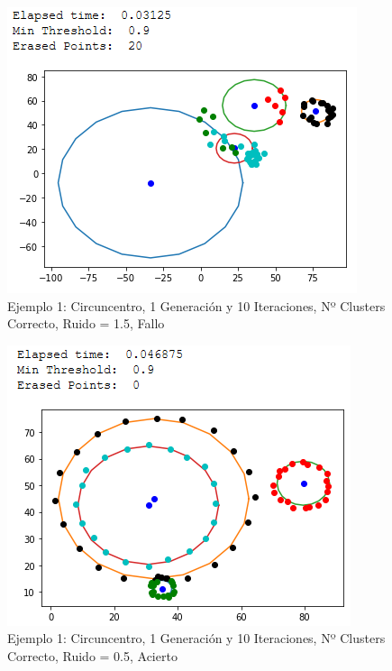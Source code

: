 \documentclass[conference,a4paper]{IEEEtran}
\begin{document}
\begin{figure}[H]
\centering
\includegraphics[scale=0.65]{Experimentacion/Ejemplo1/ej1_c_1_10_mr}
\caption{Ejemplo 1: Circuncentro, 1 Generación y 10 Iteraciones,  Nº Clusters Correcto, Ruido = 1.5, Fallo\\}
\end{figure}

\begin{figure}[H]
\centering
\includegraphics[scale=0.65]{Experimentacion/Ejemplo1/ej1_c_1_10_lr_correct}
\caption{Ejemplo 1: Circuncentro, 1 Generación y 10 Iteraciones,  Nº Clusters Correcto, Ruido = 0.5, Acierto\\}
\end{figure}
\end{document}
